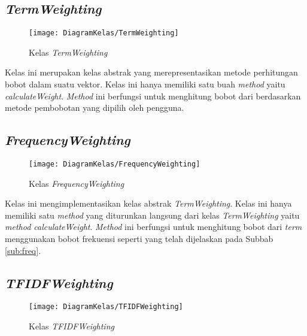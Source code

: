 \subsection{\textit{TermWeighting}}

\begin{figure}[H]
	\begin{center}
		\texttt{[image: DiagramKelas/TermWeighting]}
		\caption{Kelas \textit{TermWeighting}}
		\label{fig:kelasTermWeighting}
	\end{center}
\end{figure}

Kelas ini merupakan kelas abstrak yang merepresentasikan metode perhitungan bobot dalam suatu vektor. Kelas ini hanya memiliki satu buah \textit{method} yaitu \textit{calculateWeight}. \textit{Method} ini berfungsi untuk menghitung bobot dari \term berdasarkan metode pembobotan yang dipilih oleh pengguna.

\subsection{\textit{FrequencyWeighting}}

\begin{figure}[H]
	\begin{center}
		\texttt{[image: DiagramKelas/FrequencyWeighting]}
		\caption{Kelas \textit{FrequencyWeighting}}
		\label{fig:kelasFrequencyWeighting}
	\end{center}
\end{figure}

Kelas ini mengimplementasikan kelas abstrak \textit{TermWeighting}. Kelas ini hanya memiliki satu \textit{method} yang diturunkan langsung dari kelas \textit{TermWeighting} yaitu \textit{method calculateWeight}. \textit{Method} ini berfungsi untuk menghitung bobot dari \textit{term} menggunakan bobot frekuensi seperti yang telah dijelaskan pada Subbab \ref{sub:freq}.

\subsection{\textit{TFIDFWeighting}}

\begin{figure}[H]
	\begin{center}
		\texttt{[image: DiagramKelas/TFIDFWeighting]}
		\caption{Kelas \textit{TFIDFWeighting}}
		\label{fig:kelasTFIDFWeighting}
	\end{center}
\end{figure}

